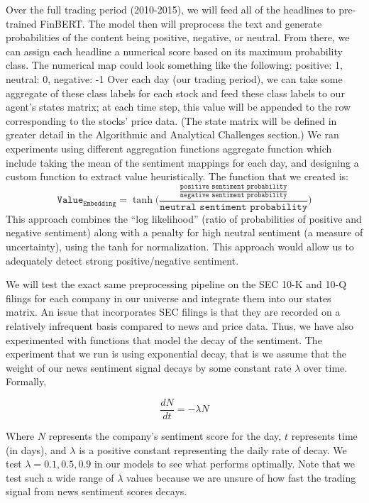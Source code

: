 Over the full trading period (2010-2015), we will feed all of the headlines to pre-trained FinBERT. 
The model then will preprocess the text and generate probabilities of the content 
being positive, negative, or neutral. From there, we can assign each headline a 
numerical score based on its maximum probability class. The numerical map could 
look something like the following:  {positive: 1, neutral: 0, negative: -1} 
Over each day (our trading period), we can take some aggregate of these class labels for 
each stock and feed these class labels to our agent’s states matrix; at each 
time step, this value will be appended to the row corresponding to the stocks’ 
price data. (The state matrix will be defined in greater detail in the Algorithmic 
and Analytical Challenges section.) We ran experiments using different aggregation functions
aggregate function which include taking the mean of the sentiment mappings for each day, and designing a custom function to extract value heuristically. 
The function that we created is:
\[\texttt{Value}_{\texttt{Embedding}} = \tanh\Biggl( \frac{\frac{\texttt{positive sentiment probability}}{\texttt{negative sentiment probability}}}{\texttt{neutral sentiment probability}} \Biggr)\]
This approach combines the “log likelihood” (ratio of probabilities of positive and 
negative sentiment) along with a penalty for high neutral sentiment (a measure of 
uncertainty), using the tanh for normalization. This approach would allow us to 
adequately detect strong positive/negative sentiment. 

We will test the exact same preprocessing pipeline on the SEC 10-K and 10-Q filings 
for each company in our universe and integrate them into our states matrix. An issue that incorporates SEC filings is that they are recorded on a 
relatively infrequent basis compared to news and price data. Thus, we have also experimented with functions that model the decay of the sentiment.
The experiment that we run is using exponential decay, that is we assume that the weight of our news sentiment signal decays by some constant rate $\lambda$ over time. Formally,

$$
\frac{dN}{dt} = -\lambda N
$$

Where $N$ represents the company's sentiment score for the day, $t$ represents time (in days), and $\lambda$ is a positive constant representing the daily rate of decay. We test $\lambda = 0.1, 0.5, 0.9$ in our models to see what performs optimally. Note that we test such a wide range of $\lambda$ values because we are unsure of how fast the trading signal from news sentiment scores decays.
 
